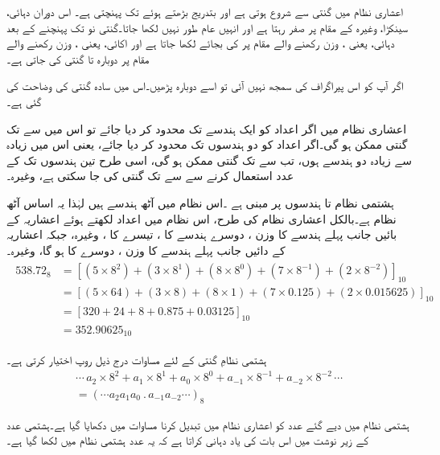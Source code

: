 	اعشاری نظام میں گنتی     سے شروع ہوتی ہے اور بتدریج بڑھتے ہوئے    تک پہنچتی ہے۔ اس دوران دہائی، سینکڑا، وغیرہ کے مقام پر صفر رہتا ہے اور انہیں عام طور نہیں لکھا جاتا۔گنتی   نو  تک پہنچنے کے بعد دہائی،  یعنی ،   وزن رکھنے والے مقام پر    کی بجائے   لکھا جاتا ہے اور اکائی،  یعنی ،     وزن رکھنے والے مقام پر دوبارہ   تا   گنتی کی جاتی  ہے۔ 
	
	اگر آپ کو اس پیراگراف کی سمجھ نہیں آئی تو اسے دوبارہ پڑھیں۔اس میں سادہ گنتی کی وضاحت کی گئی ہے۔ 
	
	اعشاری نظام میں اگر اعداد کو ایک ہندسے تک محدود کر دیا جائے تو اس میں    سے     تک گنتی ممکن ہو گی۔اگر اعداد کو دو ہندسوں تک محدود کر دیا جائے، یعنی اس میں زیادہ سے زیادہ دو ہندسے ہوں، تب    سے     تک گنتی ممکن ہو گی، اسی طرح  تین ہندسوں تک کے عدد استعمال کرنے سے     سے   تک گنتی کی جا سکتی ہے،  وغیرہ۔
	 


	ہشتمی نظام   تا    ہندسوں پر مبنی ہے ۔اس  نظام میں آٹھ ہندسے ہیں لہٰذا  یہ اساس آٹھ   نظام ہے۔بالکل اعشاری نظام کی طرح، اس نظام میں اعداد لکھتے ہوئے اعشاریہ کے بائیں جانب پہلے ہندسے  کا وزن  ، دوسرے ہندسے کا   ، تیسرے کا ،   وغیرہ، جبکہ اعشاریہ کے دائیں جانب پہلے  ہندسے کا وزن ، دوسرے    کا     ہو گا، وغیرہ۔
\begin{gather}
\begin{aligned}\label{مساوات_ثنائی_آٹھ}
538.72_8&=[(5\times 8^2)+(3\times 8^1)+(8\times8^0)+(7\times 8^{-1})+(2\times 8^{-2})]_{10}\\
&=[(5\times 64)+(3\times 8)+(8\times 1)+(7\times 0.125)+(2\times 0.015625)]_{10}\\
&=[320+24+8+0.875+0.03125]_{10}\\
&=352.90625_{10}
\end{aligned}
\end{gather}

	 ہشتمی نظامِ گنتی کے لئے مساوات       درج ذیل روپ اختیار کرتی ہے۔
\begin{multline}
\cdots\, a_2\times 8^2+a_1\times 8^1+a_0\times 8^0+a_{-1}\times 8^{-1}+a_{-2}\times 8^{-2}\,\cdots\\
=(\cdots a_2a_1a_0\ . \,a_{-1}a_{-2}\cdots)_{8}
\end{multline}

	 ہشتمی نظام میں دیے گئے عدد کو اعشاری نظام میں تبدیل کرنا  مساوات    میں دکھایا گیا ہے۔ہشتمی عدد کے زیر نوشت  میں   اس بات کی یاد دہانی کراتا ہے کہ یہ عدد ہشتمی نظام میں لکھا گیا ہے۔ 
	 
